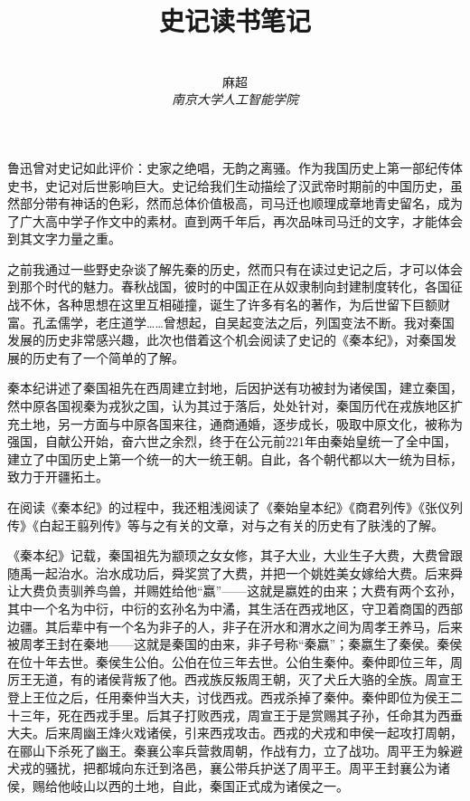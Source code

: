 \documentclass[12pt,a4paper]{ctexart}
\title{\textbf{史记读书笔记}}
\author{
\\
\Large{麻超 \quad 201300066}
\\[6pt]
{ \large \textit{南京大学人工智能学院}}\\[2pt]
}
\date{}
\begin{document}
\maketitle
\setcounter{page}{1}

鲁迅曾对史记如此评价：史家之绝唱，无韵之离骚。作为我国历史上第一部纪传体史书，史记对后世影响巨大。史记给我们生动描绘了汉武帝时期前的中国历史，虽然部分带有神话的色彩，然而总体价值极高，司马迁也顺理成章地青史留名，成为了广大高中学子作文中的素材。直到两千年后，再次品味司马迁的文字，才能体会到其文字力量之重。

之前我通过一些野史杂谈了解先秦的历史，然而只有在读过史记之后，才可以体会到那个时代的魅力。春秋战国，彼时的中国正在从奴隶制向封建制度转化，各国征战不休，各种思想在这里互相碰撞，诞生了许多有名的著作，为后世留下巨额财富。孔孟儒学，老庄道学……曾想起，自吴起变法之后，列国变法不断。我对秦国发展的历史非常感兴趣，此次也借着这个机会阅读了史记的《秦本纪》，对秦国发展的历史有了一个简单的了解。

秦本纪讲述了秦国祖先在西周建立封地，后因护送有功被封为诸侯国，建立秦国，然中原各国视秦为戎狄之国，认为其过于落后，处处针对，秦国历代在戎族地区扩充土地，另一方面与中原各国来往，通商通婚，逐步成长，吸取中原文化，被称为强国，自献公开始，奋六世之余烈，终于在公元前221年由秦始皇统一了全中国，建立了中国历史上第一个统一的大一统王朝。自此，各个朝代都以大一统为目标，致力于开疆拓土。

在阅读《秦本纪》的过程中，我还粗浅阅读了《秦始皇本纪》《商君列传》《张仪列传》《白起王翦列传》等与之有关的文章，对与之有关的历史有了肤浅的了解。

《秦本纪》记载，秦国祖先为颛顼之女女修，其子大业，大业生子大费，大费曾跟随禹一起治水。治水成功后，舜奖赏了大费，并把一个姚姓美女嫁给大费。后来舜让大费负责驯养鸟兽，并赐姓给他“嬴”——这就是嬴姓的由来；大费有两个玄孙，其中一个名为中衍，中衍的玄孙名为中潏，其生活在西戎地区，守卫着商国的西部边疆。其后辈中有一个名为非子的人，非子在汧水和渭水之间为周孝王养马，后来被周孝王封在秦地——这就是秦国的由来，非子号称“秦嬴”；秦嬴生了秦侯。秦侯在位十年去世。秦侯生公伯。公伯在位三年去世。公伯生秦仲。秦仲即位三年，周厉王无道，有的诸侯背叛了他。西戎族反叛周王朝，灭了犬丘大骆的全族。周宣王登上王位之后，任用秦仲当大夫，讨伐西戎。西戎杀掉了秦仲。秦仲即位为侯王二十三年，死在西戎手里。后其子打败西戎，周宣王于是赏赐其子孙，任命其为西垂大夫。后来周幽王烽火戏诸侯，引来西戎攻击。西戎的犬戎和申侯一起攻打周朝，在郦山下杀死了幽王。秦襄公率兵营救周朝，作战有力，立了战功。周平王为躲避犬戎的骚扰，把都城向东迁到洛邑，襄公带兵护送了周平王。周平王封襄公为诸侯，赐给他岐山以西的土地，自此，秦国正式成为诸侯之一。
\end{document}
